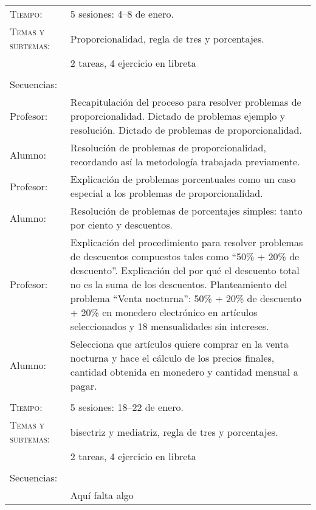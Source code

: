 \documentclass[letterpaper,10pt]{article}
\begin{document}
\begin{tabular}[t]{R{0.25\textwidth}p{0.71\textwidth}}
    \textsc{Tiempo:}          & 5 sesiones: 4--8  de enero. \\
    \textsc{Temas y subtemas:}& Proporcionalidad, regla de tres y porcentajes.\\
    & 2 tareas, 4 ejercicio en libreta\\ \\
    \large{\sc Secuencias:} \\
    
    Profesor:   & Recapitulaci\'on del proceso para resolver problemas de
    proporcionalidad. Dictado de problemas ejemplo y resoluci\'on. Dictado de
    problemas de proporcionalidad.\\    
    Alumno:     & Resoluci\'on de problemas de proporcionalidad, recordando
    as\'i la metodolog\'ia trabajada previamente.  \\
    Profesor:   & Explicaci\'on de problemas porcentuales como un caso especial
    a los problemas de proporcionalidad. \\    
    Alumno:     & Resoluci\'on de problemas de porcentajes simples: tanto por
    ciento y descuentos. \\    
    Profesor:   & Explicaci\'on del procedimiento para resolver problemas de
    descuentos compuestos tales como ``50\% + 20\% de descuento''. Explicaci\'on
    del por qu\'e el descuento total no es la suma de los descuentos.
    Planteamiento del problema ``Venta nocturna'': 50\% + 20\% de descuento +
    20\% en monedero electr\'onico en art\'iculos seleccionados y 18
    mensualidades sin intereses. \\ Alumno:     & Selecciona que art\'iculos
    quiere comprar en la venta nocturna y hace el c\'alculo de los precios
    finales, cantidad obtenida en monedero y cantidad mensual a pagar.
\\ \hline \\
    \textsc{Tiempo:}           & 5 sesiones: 18--22  de enero. \\
    \textsc{Temas y subtemas:} & bisectriz y mediatriz, regla de tres y porcentajes.\\
     & 2 tareas, 4 ejercicio en libreta\\ \\
    \large{\sc Secuencias:} \\

                    & {\Huge Aqu\'i falta algo}
\end{tabular}
\end{document}
